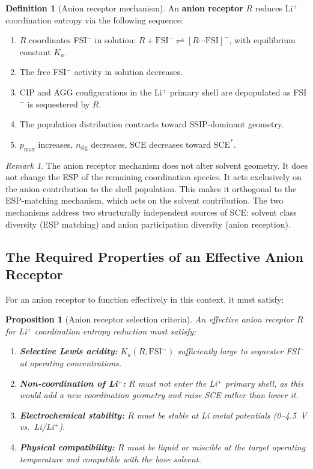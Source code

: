 \documentclass[11pt]{article}
\theoremstyle{plain}
\newtheorem{proposition}[theorem]{Proposition}
\theoremstyle{definition}
\newtheorem{definition}{Definition}[section]
\theoremstyle{remark}
\newtheorem{remark}{Remark}[section]
\begin{document}
\begin{definition}[Anion receptor mechanism]
An \textbf{anion receptor} $R$ reduces Li$^+$ coordination entropy via
the following sequence:
\begin{enumerate}[label=(\roman*)]
  \item $R$ coordinates FSI$^-$ in solution:
        $R + \mathrm{FSI}^- \rightleftharpoons [R\cdots\mathrm{FSI}]^-$,
        with equilibrium constant $K_a$.
  \item The free FSI$^-$ activity in solution decreases.
  \item CIP and AGG configurations in the Li$^+$ primary shell are
        depopulated as FSI$^-$ is sequestered by $R$.
  \item The population distribution contracts toward SSIP-dominant
        geometry.
  \item $p_{\max}$ increases, $n_{\mathrm{sig}}$ decreases,
        $\mathrm{SCE}$ decreases toward $\mathrm{SCE}^{*}$.
\end{enumerate}
\end{definition}

\begin{remark}
The anion receptor mechanism does not alter solvent geometry.  It does
not change the ESP of the remaining coordination species.  It acts
exclusively on the anion contribution to the shell population.  This
makes it orthogonal to the ESP-matching mechanism, which acts on the
solvent contribution.  The two mechanisms address two structurally
independent sources of SCE: solvent class diversity (ESP matching) and
anion participation diversity (anion reception).
\end{remark}

\subsection{The Required Properties of an Effective Anion Receptor}

For an anion receptor to function effectively in this context, it must
satisfy:

\begin{proposition}[Anion receptor selection criteria]
An effective anion receptor $R$ for Li$^+$ coordination entropy
reduction must satisfy:
\begin{enumerate}[label=(\roman*)]
  \item \textbf{Selective Lewis acidity:} $K_a(R, \mathrm{FSI}^-)$
        sufficiently large to sequester FSI$^-$ at operating
        concentrations.
  \item \textbf{Non-coordination of Li$^+$:} $R$ must not enter the
        Li$^+$ primary shell, as this would add a new coordination
        geometry and raise SCE rather than lower it.
  \item \textbf{Electrochemical stability:} $R$ must be stable at
        Li metal potentials (0--4.5~V vs.\ Li/Li$^+$).
  \item \textbf{Physical compatibility:} $R$ must be liquid or
        miscible at the target operating temperature and compatible
        with the base solvent.
\end{enumerate}
\end{proposition}
\end{document}
